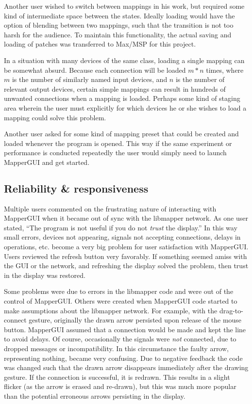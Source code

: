 Another user wished to switch between mappings in his work, but required some kind of intermediate space between the states. Ideally loading would have the option of blending between two mappings, such that the transition is not too harsh for the audience. To maintain this functionality, the actual saving and loading of patches was transferred to Max/MSP for this project.

In a situation with many devices of the same class, loading a single mapping can be somewhat absurd. Because each connection will be loaded $m*n$ times, where $m$ is the number of similarly named input devices, and $n$ is the number of relevant output devices, certain simple mappings can result in hundreds of unwanted connections when a mapping is loaded. Perhaps some kind of staging area wherein the user must explicitly for which devices he or she wishes to load a mapping could solve this problem.

Another user asked for some kind of mapping preset that could be created and loaded whenever the program is opened. This way if the same experiment or performance is conducted repeatedly the user would simply need to launch MapperGUI and get started.
	

	\subsection{Reliability \& responsiveness} %
	\label{sub:reliability_and_responsiveness}

Multiple users commented on the frustrating nature of interacting with MapperGUI when it became out of sync with the libmapper network. As one user stated, ``The program is not useful if you do not \emph{trust} the display.'' In this way small errors, devices not appearing, signals not accepting connections, delays in operations, etc. become a very big problem for user satisfaction with MapperGUI. Users reviewed the refresh button very favorably. If something seemed amiss with the GUI or the network, and refreshing the display solved the problem, then trust in the display was restored.

Some problems were due to errors in the libmapper code and were out of the control of MapperGUI. Others were created when MapperGUI code started to make assumptions about the libmapper network. For example, with the drag-to-connect gesture, originally the drawn arrow persisted upon release of the mouse button. MapperGUI assumed that a connection would be made and kept the line to avoid delays. Of course, occasionally the signals were \emph{not} connected, due to dropped messages or incompatibility. In this circumstance the faulty arrow, representing nothing, became very confusing. Due to negative feedback the code was changed such that the drawn arrow disappears immediately after the drawing gesture. If the connection is successful, it is redrawn. This results in a slight flicker (as the arrow is erased and re-drawn), but this was much more popular than the potential erroneous arrows persisting in the display.

